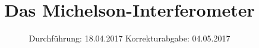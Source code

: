 

\subject{V401}
\title{Das Michelson-Interferometer}
\date{
\centering
  Durchführung: 18.04.2017
  \hspace{3em}
  Korrekturabgabe: 04.05.2017 \\
}



\maketitle
\thispagestyle{empty}
\tableofcontents
\newpage



%




\printbibliography


